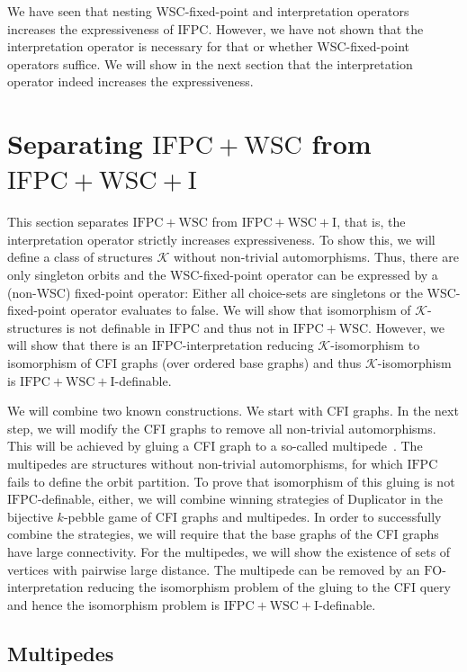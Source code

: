 \documentclass[]{lmcs}
\newcommand{\GraphClass}{\mathcal{K}}
\newcommand{\FO}{\ensuremath{\mathrm{FO}}}
\newcommand{\IFPC}{\ensuremath{\mathrm{IFPC}}}
\newcommand{\IFPCWSC}{\ensuremath{\mathrm{IFPC{+}WSC}}}
\newcommand{\IFPCWSCI}{\ensuremath{\mathrm{IFPC{+}WSC{+}I}}}
\begin{document}
We have seen that nesting WSC-fixed-point and interpretation operators increases the expressiveness of \IFPC{}.
However, we have not shown that the interpretation operator is necessary for that
or whether WSC-fixed-point operators suffice.
We will show in the next section that the interpretation operator indeed increases the expressiveness.





\section{Separating \IFPCWSC{} from \IFPCWSCI{}}
\label{sec:separating-wsc-wsci}

This section separates \IFPCWSC{} from \IFPCWSCI{},
that is, the interpretation operator strictly increases expressiveness.
To show this, we will define a class of structures $\GraphClass$ without non-trivial automorphisms.
Thus, there are only singleton orbits
and the WSC-fixed-point operator can be expressed
by a (non-WSC) fixed-point operator:
Either all choice-sets are singletons or the WSC-fixed-point operator evaluates to false.
We will show that isomorphism of $\GraphClass$-structures is
not definable in \IFPC{} and thus not in \IFPCWSC{}.
However, we will show that there is an \IFPC{}-interpretation
reducing $\GraphClass$-isomorphism to
isomorphism of CFI graphs (over ordered base graphs)
and thus $\GraphClass$\nobreakdash-isomorphism is \IFPCWSCI{}-definable.

We will combine two known constructions.
We start with CFI graphs.
In the next step, we will modify the CFI graphs to remove all non-trivial automorphisms.
This will be achieved by gluing a CFI graph to a so-called multipede~\cite{GurevichShelah96}.
The multipedes are structures without non-trivial automorphisms, for which \IFPC{} fails to define the orbit partition.
To prove that isomorphism of this gluing is not \IFPC{}-definable, either,
we will combine winning strategies of Duplicator in the bijective $k$-pebble game
of CFI graphs and multipedes.
In order to successfully combine the strategies,
we will require that the base graphs of the CFI graphs have large connectivity.
For the multipedes, we will show the existence of sets of vertices
with pairwise large distance.
The multipede can be removed by an \FO{}-interpretation
reducing the isomorphism problem of the gluing to the CFI query
and hence the isomorphism problem is \IFPCWSCI{}-definable.


\subsection{Multipedes}
\end{document}
